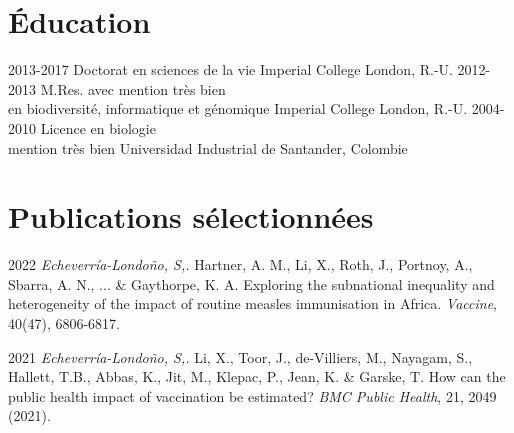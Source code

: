 \documentclass[icon]{twentysecondcv}
\begin{document}
\begin{twenty}
{     }
        	

	    
    
\end{twenty}


\section{Éducation}

\begin{twenty}
  \twentyitem
    {2013-2017}
    {Doctorat  {\normalfont en sciences de la vie}}
    {Imperial College London, R.-U.}
    {}
  \twentyitem
    {2012-2013}
    {M.Res. avec mention très bien \\  {\normalfont en biodiversité, informatique et génomique}}
    {Imperial College London, R.-U.}
    {}
  \twentyitem
    {2004-2010}
    {Licence en biologie  \\  mention très bien}
    {Universidad Industrial de Santander, Colombie}
    {}
 \end{twenty}
 
 
\section{Publications sélectionnées}

\small 2022 \textit{Echeverr\'ia-Londo\~no, S,.}  Hartner, A. M., Li, X., Roth, J., Portnoy, A., Sbarra, A. N., ... \& Gaythorpe, K. A. Exploring the subnational inequality and heterogeneity of the impact of routine measles immunisation in Africa. \textit{Vaccine}, 40(47), 6806-6817. 

\small  2021 \textit{Echeverr\'ia-Londo\~no, S,.}  Li, X., Toor, J., de-Villiers, M., Nayagam, S., Hallett, T.B., Abbas, K., Jit, M., Klepac, P., Jean, K. \&  Garske, T. How can the public health impact of vaccination be estimated? \textit{BMC Public Health}, 21, 2049 (2021).
\end{document}
